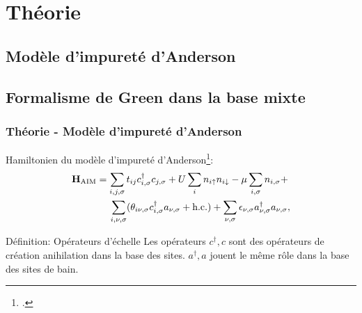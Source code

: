 
\section{Théorie}

\subsection{Modèle d'impureté d'Anderson}

\subsection{Formalisme de Green dans la base mixte}


\begin{frame}
    \begin{center}
    \vspace{0.5cm}
    \end{center}
\end{frame}

\begin{frame}
    \frametitle{Théorie - Modèle d'impureté d'Anderson}
    Hamiltonien du modèle d'impureté d'Anderson\footcite{CHARLEBOIS}:
    \begin{align}
        \vb{H}_{\text{AIM}} &= \sum_{i,j,\sigma}t_{ij}c_{i,\sigma}^\dagger c_{j,\sigma} + U\sum_in_{i\uparrow}n_{i\downarrow} - \mu\sum_{i,\sigma}n_{i,\sigma} + \nonumber\\
            &\hspace{0.45cm}\sum_{i,\nu,\sigma}(\theta_{i\nu,\sigma}c_{i,\sigma}^\dagger a_{\nu,\sigma} + \text{h.c.}) + \sum_{\nu,\sigma}\epsilon_{\nu,\sigma}a^\dagger_{\nu,\sigma}a_{\nu,\sigma},
        \label{eq: H_AIM}
    \end{align}
    \pause
    \begin{defblock}{Définition: Opérateurs d'échelle}
        Les opérateurs $c^\dagger, c$ sont des opérateurs de création anihilation dans la base des
        sites. $a^\dagger, a$ jouent le même rôle dans la base des sites de bain.
    \end{defblock}
\end{frame}

